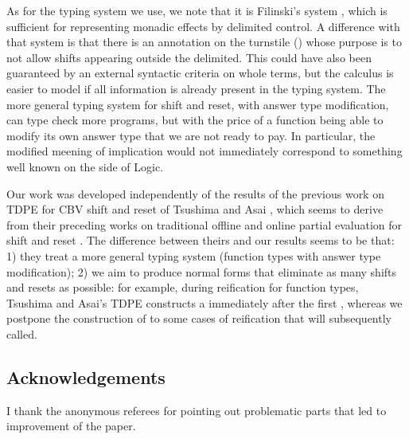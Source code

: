 \documentclass{eptcs}
\theoremstyle{definition}
\theoremstyle{plain}
\theoremstyle{remark}
\begin{document}
As for the typing system we use, we note that it is Filinski's system \cite{FilinskiThesis}, which is sufficient for representing monadic effects by delimited control. A difference with that system is that there is an annotation  on the turnstile () whose purpose is to not allow shifts appearing outside the delimited. This could have also been guaranteed by an external syntactic criteria on whole terms, but the calculus is easier to model if all information is already present in the typing system. The more general typing system for shift and reset, with answer type modification, can type check more programs, but with the price of a function being able to modify its own answer type that we are not ready to pay. In particular, the modified meening of implication would not immediately correspond to something well known on the side of Logic.

Our work was developed independently of the results of the previous work on TDPE for CBV shift and reset of Tsushima and Asai \cite{TsushimaAsai2009}, which seems to derive from their preceding works on traditional offline and online partial evaluation for shift and reset \cite{Asai2002,Asai2004}. The difference between theirs and our results seems to be that: 1) they treat a more general typing system (function types with answer type modification); 2) we aim to produce normal forms that eliminate as many shifts and resets as possible: for example, during reification for function types, Tsushima and Asai's TDPE constructs a  immediately after the first , whereas we postpone the construction of  to some cases of reification that will subsequently called.

\subsection*{Acknowledgements}
I thank the anonymous referees for pointing out problematic parts that led to improvement of the paper. 



\end{document}
